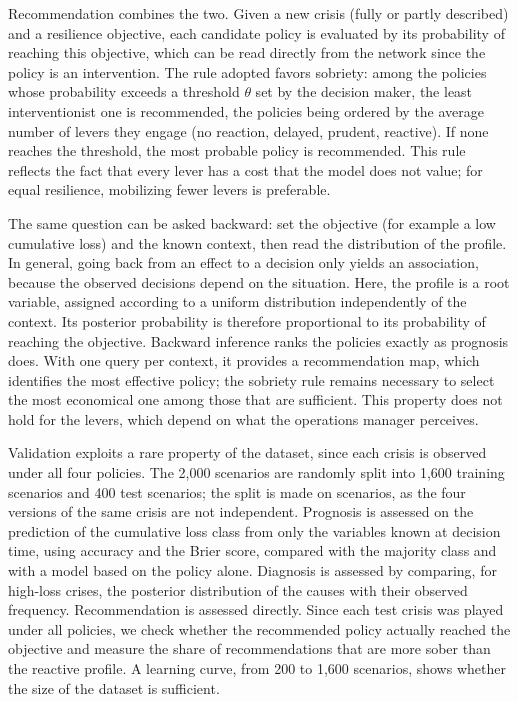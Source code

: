 Recommendation combines the two. Given a new crisis (fully or partly described) and a resilience objective, each candidate policy is evaluated by its probability of reaching this objective, which can be read directly from the network since the policy is an intervention. The rule adopted favors sobriety: among the policies whose probability exceeds a threshold $\theta$ set by the decision maker, the least interventionist one is recommended, the policies being ordered by the average number of levers they engage (no reaction, delayed, prudent, reactive). If none reaches the threshold, the most probable policy is recommended. This rule reflects the fact that every lever has a cost that the model does not value; for equal resilience, mobilizing fewer levers is preferable.

The same question can be asked backward: set the objective (for example a low cumulative loss) and the known context, then read the distribution of the profile. In general, going back from an effect to a decision only yields an association, because the observed decisions depend on the situation. Here, the profile is a root variable, assigned according to a uniform distribution independently of the context. Its posterior probability is therefore proportional to its probability of reaching the objective. Backward inference ranks the policies exactly as prognosis does. With one query per context, it provides a recommendation map, which identifies the most effective policy; the sobriety rule remains necessary to select the most economical one among those that are sufficient. This property does not hold for the levers, which depend on what the operations manager perceives.

Validation exploits a rare property of the dataset, since each crisis is observed under all four policies. The 2,000 scenarios are randomly split into 1,600 training scenarios and 400 test scenarios; the split is made on scenarios, as the four versions of the same crisis are not independent. Prognosis is assessed on the prediction of the cumulative loss class from only the variables known at decision time, using accuracy and the Brier score, compared with the majority class and with a model based on the policy alone. Diagnosis is assessed by comparing, for high-loss crises, the posterior distribution of the causes with their observed frequency. Recommendation is assessed directly. Since each test crisis was played under all policies, we check whether the recommended policy actually reached the objective and measure the share of recommendations that are more sober than the reactive profile. A learning curve, from 200 to 1,600 scenarios, shows whether the size of the dataset is sufficient.
